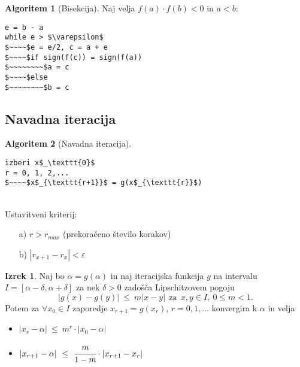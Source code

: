 \documentclass[11pt]{article}
\theoremstyle{definition}
\newtheorem{izrek}{Izrek}
\newtheorem*{algoritem}{Algoritem}
\begin{document}
\begin{algoritem}[Bisekcija]

Naj velja $f(a) \cdot f(b) < 0$ in $a < b$:
\begin{lstlisting}
e = b - a
while e > $\varepsilon$
$~~~~$e = e/2, c = a + e
$~~~~$if sign(f(c)) = sign(f(a))
$~~~~~~~~$a = c
$~~~~$else
$~~~~~~~~$b = c
\end{lstlisting}
\end{algoritem}
\vspace{0.5cm}


\subsection{Navadna iteracija}
\vspace{0.5cm}

\begin{algoritem}[Navadna iteracija]
~\\
\begin{lstlisting}
izberi x$_\texttt{0}$
r = 0, 1, 2,...
$~~~~$x$_{\texttt{r+1}}$ = g(x$_{\texttt{r}}$)
\end{lstlisting}
~\\
Ustavitveni kriterij:
\begin{enumerate}
	\item[a)] $r > r_{max}$ (prekoračeno število korakov)
	\item[b)] $|r_{x+1} - r_x| < \varepsilon$
\end{enumerate}
\end{algoritem}
\vspace{0.5cm}

\begin{izrek}

Naj bo $\alpha = g(\alpha)$ in naj iteracijska  funkcija $g$ na intervalu $I = [\alpha - \delta, \alpha + \delta]$ za nek $\delta > 0$ zadošča Lipschitzovem pogoju
$$|g(x) - g(y)| ~\leq~ m|x - y| ~~\text{za}~~ x, y \in I, ~0 \leq m < 1.$$
Potem za $\forall x_0 \in I$ zaporedje $x_{r+1} = g(x_r)$, $r = 0, 1, \ldots$ konvergira k $\alpha$ in velja
\begin{itemize}
	\item $|x_r - \alpha| ~\leq~ m^r \cdot |x_0 - \alpha|$
	\item $|x_{r+1} - \alpha| ~\leq~ \cfrac{m}{1-m} \cdot |x_{r+1} - x_r|$
\end{itemize}

\end{izrek}
\vspace{0.5cm}
\end{document}
